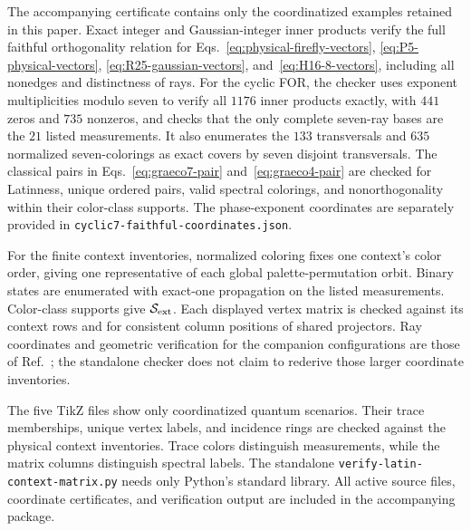 \documentclass[aps,pra,reprint,superscriptaddress,longbibliography,nofootinbib,floatfix,10pt]{revtex4-2}
\theoremstyle{definition}\newtheorem{definition}[theorem]{Definition}
\theoremstyle{remark}\newtheorem{remark}[theorem]{Remark}
\newcommand{\Sc}{\mathcal S}\newcommand{\Cc}{\mathcal C}
\begin{document}
The accompanying certificate contains only the coordinatized examples retained in this paper. Exact integer and Gaussian-integer inner products verify the full faithful orthogonality relation for Eqs.~\eqref{eq:physical-firefly-vectors}, \eqref{eq:P5-physical-vectors}, \eqref{eq:R25-gaussian-vectors}, and~\eqref{eq:H16-8-vectors}, including all nonedges and distinctness of rays. For the cyclic FOR, the checker uses exponent multiplicities modulo seven to verify all $1176$ inner products exactly, with $441$ zeros and $735$ nonzeros, and checks that the only complete seven-ray bases are the $21$ listed measurements. It also enumerates the $133$ transversals and $635$ normalized seven-colorings as exact covers by seven disjoint transversals. The classical pairs in Eqs.~\eqref{eq:graeco7-pair} and~\eqref{eq:graeco4-pair} are checked for Latinness, unique ordered pairs, valid spectral colorings, and nonorthogonality within their color-class supports. The phase-exponent coordinates are separately provided in \texttt{cyclic7-faithful-coordinates.json}.

For the finite context inventories, normalized coloring fixes one context's color order, giving one representative of each global palette-permutation orbit. Binary states are enumerated with exact-one propagation on the listed measurements. Color-class supports give $\Sc_{\rm ext}$. Each displayed vertex matrix is checked against its context rows and for consistent column positions of shared projectors. Ray coordinates and geometric verification for the companion configurations are those of Ref.~\cite{svozil2026contexts,supplement}; the standalone checker does not claim to rederive those larger coordinate inventories.

The five TikZ files show only coordinatized quantum scenarios. Their trace memberships, unique vertex labels, and incidence rings are checked against the physical context inventories. Trace colors distinguish measurements, while the matrix columns distinguish spectral labels. The standalone \texttt{verify-latin-context-matrix.py} needs only Python's standard library. All active source files, coordinate certificates, and verification output are included in the accompanying package.


\end{document}
